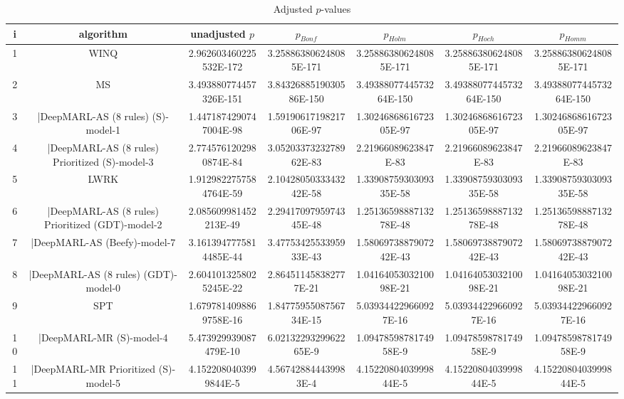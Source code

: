 \documentclass[a3paper,10pt]{article}
\begin{document}
\begin{table}[!htp]
\centering\tiny
\caption{Adjusted $p$-values}
\begin{tabular}{ccccccc}
i&algorithm&unadjusted $p$&$p_{Bonf}$&$p_{Holm}$&$p_{Hoch}$&$p_{Homm}$\\
\hline
1&WINQ&2.962603460225532E-172&3.258863806248085E-171&3.258863806248085E-171&3.258863806248085E-171&3.258863806248085E-171\\
2&MS&3.493880774457326E-151&3.8432688519030586E-150&3.4938807744573264E-150&3.4938807744573264E-150&3.4938807744573264E-150\\
3&|DeepMARL-AS (8 rules) (S)-model-1&1.4471874290747004E-98&1.5919061719821706E-97&1.3024686861672305E-97&1.3024686861672305E-97&1.3024686861672305E-97\\
4&|DeepMARL-AS (8 rules) Prioritized (S)-model-3&2.7745761202980874E-84&3.0520337323278962E-83&2.21966089623847E-83&2.21966089623847E-83&2.21966089623847E-83\\
5&LWRK&1.9129822757584764E-59&2.1042805033343242E-58&1.3390875930309335E-58&1.3390875930309335E-58&1.3390875930309335E-58\\
6&|DeepMARL-AS (8 rules) Prioritized (GDT)-model-2&2.085609981452213E-49&2.2941709795974345E-48&1.2513659888713278E-48&1.2513659888713278E-48&1.2513659888713278E-48\\
7&|DeepMARL-AS (Beefy)-model-7&3.1613947775814485E-44&3.4775342553395933E-43&1.5806973887907242E-43&1.5806973887907242E-43&1.5806973887907242E-43\\
8&|DeepMARL-AS (8 rules) (GDT)-model-0&2.6041013258025245E-22&2.864511458382777E-21&1.0416405303210098E-21&1.0416405303210098E-21&1.0416405303210098E-21\\
9&SPT&1.6797814098869758E-16&1.8477595508756734E-15&5.039344229660927E-16&5.039344229660927E-16&5.039344229660927E-16\\
10&|DeepMARL-MR (S)-model-4&5.473929939087479E-10&6.0213229329962265E-9&1.0947859878174958E-9&1.0947859878174958E-9&1.0947859878174958E-9\\
11&|DeepMARL-MR Prioritized (S)-model-5&4.1522080403999844E-5&4.567428844439983E-4&4.1522080403999844E-5&4.1522080403999844E-5&4.1522080403999844E-5\\
\hline
\end{tabular}
\end{table}
\end{document}
